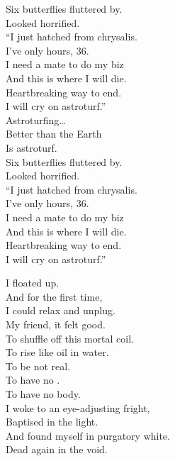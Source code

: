 Six butterflies fluttered by. \\
Looked horrified. \\
``I just hatched from chrysalis. \\
I've only hours, 36. \\
I need a mate to do my biz \\
And this is where I will die. \\
Heartbreaking way to end. \\
I will cry on astroturf.'' \\

Astroturfing… \\

Better than the Earth \\
Is astroturf. \\

Six butterflies fluttered by. \\
Looked horrified. \\
``I just hatched from chrysalis. \\
I've only hours, 36. \\
I need a mate to do my biz \\
And this is where I will die. \\
Heartbreaking way to end. \\
I will cry on astroturf.'' \\





I floated up. \\
And for the first time, \\
I could relax and unplug. \\
My friend, it felt good. \\

To shuffle off this mortal coil. \\
To rise like oil in water. \\
To be not real. \\
To have no . \\
To have no body. \\

I woke to an eye-adjusting fright, \\
Baptised in the light. \\
And found myself in purgatory white. \\
Dead again in the void. \\


